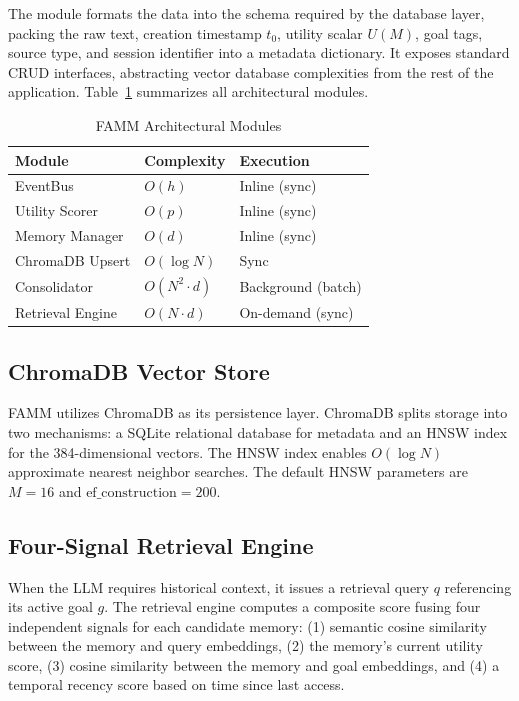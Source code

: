 \documentclass[conference]{IEEEtran}
\begin{document}
The module formats the data into the schema required by the database layer, packing the raw text, creation timestamp $t_0$, utility scalar $U(M)$, goal tags, source type, and session identifier into a metadata dictionary. It exposes standard CRUD interfaces, abstracting vector database complexities from the rest of the application. Table~\ref{tab:modules} summarizes all architectural modules.

\begin{table}[htbp]
\caption{FAMM Architectural Modules}
\label{tab:modules}
\begin{center}
\small
\begin{tabular}{lll}
\toprule
\textbf{Module} & \textbf{Complexity} & \textbf{Execution} \\
\midrule
EventBus & $O(h)$ & Inline (sync) \\
Utility Scorer & $O(p)$ & Inline (sync) \\
Memory Manager & $O(d)$ & Inline (sync) \\
ChromaDB Upsert & $O(\log N)$ & Sync \\
Consolidator & $O(N^2 \cdot d)$ & Background (batch) \\
Retrieval Engine & $O(N \cdot d)$ & On-demand (sync) \\
\bottomrule
\end{tabular}
\end{center}
\end{table}

\subsection{ChromaDB Vector Store}
FAMM utilizes ChromaDB as its persistence layer. ChromaDB splits storage into two mechanisms: a SQLite relational database for metadata and an HNSW index \cite{malkov2018hnsw} for the 384-dimensional vectors. The HNSW index enables $O(\log N)$ approximate nearest neighbor searches. The default HNSW parameters are $M{=}16$ and $\text{ef\_construction}{=}200$.

\subsection{Four-Signal Retrieval Engine}
When the LLM requires historical context, it issues a retrieval query $q$ referencing its active goal $g$. The retrieval engine computes a composite score fusing four independent signals for each candidate memory: (1) semantic cosine similarity between the memory and query embeddings, (2) the memory's current utility score, (3) cosine similarity between the memory and goal embeddings, and (4) a temporal recency score based on time since last access.
\end{document}

